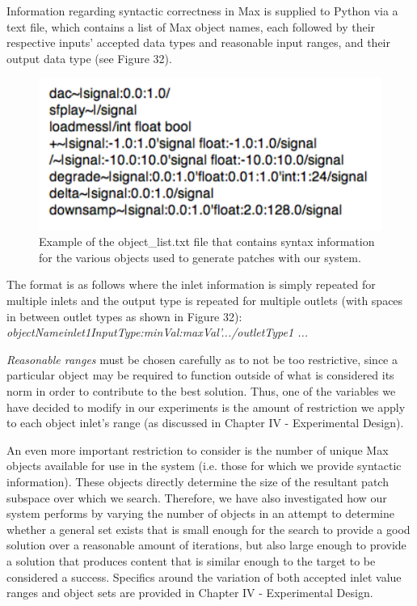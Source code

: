 \documentclass[12pt]{report} 	%
\numberwithin{figure}{chapter}
\numberwithin{table}{chapter}
\numberwithin{equation}{chapter}
\begin{document}
\begin{flushleft}
Information regarding syntactic correctness in Max is supplied to Python via a text file, which contains a list of Max object names, each followed by their respective inputs' accepted data types and reasonable input ranges, and their output data type (see Figure 32).
\begin{figure}[h!]
\begin{center}
\includegraphics[scale=0.8]{SyntaxInfo}
\caption[Object list file]{Example of the object\_list.txt file that contains syntax information for the various objects used to generate patches with our system.}
\end{center}
\vspace{9pt}
\end{figure}

The format is as follows where the inlet information is simply repeated for multiple inlets and the output type is repeated for multiple outlets (with spaces in between outlet types as shown in Figure 32):
\\
{\textit{objectName\textbar inlet1InputType:minVal:maxVal'.../outletType1 ...}}

\textit{Reasonable ranges} must be chosen carefully as to not be too restrictive, since a particular object may be required to function outside of what is considered its norm in order to contribute to the best solution. Thus, one of the variables we have decided to modify in our experiments is the amount of restriction we apply to each object inlet's range (as discussed in Chapter IV - Experimental Design).

An even more important restriction to consider is the number of unique Max objects available for use in the system (i.e. those for which we provide syntactic information). These objects directly determine the size of the resultant patch subspace over which we search. Therefore, we have also investigated how our system performs by varying the number of objects in an attempt to determine whether a general set exists that is small enough for the search to provide a good solution over a reasonable amount of iterations, but also large enough to provide a solution that produces content that is similar enough to the target to be considered a success. Specifics around the variation of both accepted inlet value ranges and object sets are provided in Chapter IV - Experimental Design.


\end{flushleft}
\end{document}
